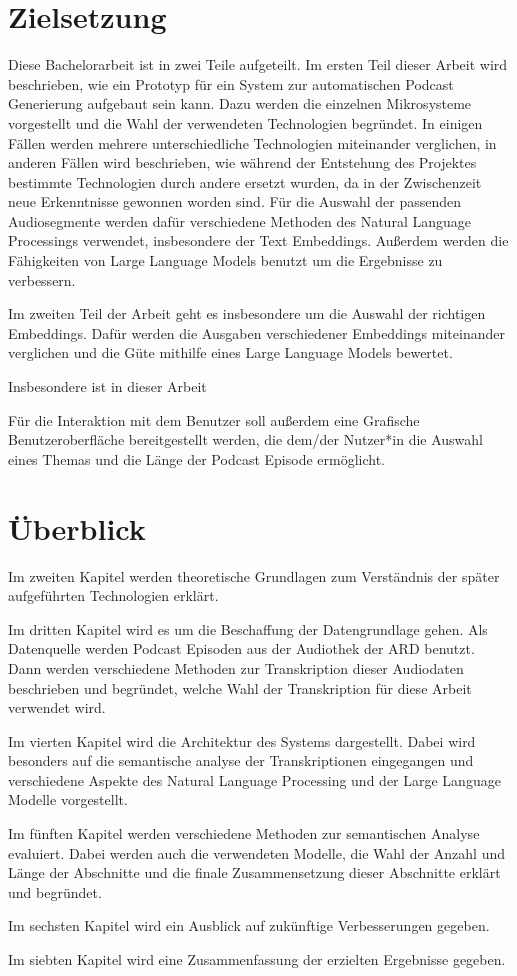 \section{Zielsetzung}




Diese Bachelorarbeit ist in zwei Teile aufgeteilt.
Im ersten Teil dieser Arbeit wird beschrieben, wie ein Prototyp für ein System zur automatischen Podcast Generierung aufgebaut sein kann.
Dazu werden die einzelnen Mikrosysteme vorgestellt und die Wahl der verwendeten Technologien begründet.
In einigen Fällen werden mehrere unterschiedliche Technologien miteinander verglichen, in anderen Fällen wird beschrieben, wie während der Entstehung des Projektes bestimmte Technologien durch andere ersetzt wurden, da in der Zwischenzeit neue Erkenntnisse gewonnen worden sind.
Für die Auswahl der passenden Audiosegmente werden dafür verschiedene Methoden des Natural Language Processings verwendet, insbesondere der Text Embeddings.
Außerdem werden die Fähigkeiten von Large Language Models benutzt um die Ergebnisse zu verbessern.

Im zweiten Teil der Arbeit geht es insbesondere um die Auswahl der richtigen Embeddings.
Dafür werden die Ausgaben verschiedener Embeddings miteinander verglichen und die Güte mithilfe eines Large Language Models bewertet.



Insbesondere ist in dieser Arbeit 

Für die Interaktion mit dem Benutzer soll außerdem eine Grafische Benutzeroberfläche bereitgestellt werden, die dem/der Nutzer*in die Auswahl eines Themas und die Länge der Podcast Episode ermöglicht.

\section{Überblick}

Im zweiten Kapitel werden theoretische Grundlagen zum Verständnis der später aufgeführten Technologien erklärt.

Im dritten Kapitel wird es um die Beschaffung der Datengrundlage gehen. 
Als Datenquelle werden Podcast Episoden aus der Audiothek der ARD benutzt. 
Dann werden verschiedene Methoden zur Transkription dieser Audiodaten beschrieben und begründet, welche Wahl der Transkription für diese Arbeit verwendet wird.

Im vierten Kapitel wird die Architektur des Systems dargestellt. 
Dabei wird besonders auf die semantische analyse der Transkriptionen eingegangen und verschiedene Aspekte des Natural Language Processing und der Large Language Modelle vorgestellt.

Im fünften Kapitel werden verschiedene Methoden zur semantischen Analyse evaluiert.
Dabei werden auch die verwendeten Modelle, die Wahl der Anzahl und Länge der Abschnitte und die finale Zusammensetzung dieser Abschnitte erklärt und begründet.

Im sechsten Kapitel wird ein Ausblick auf zukünftige Verbesserungen gegeben.

Im siebten Kapitel wird eine Zusammenfassung der erzielten Ergebnisse gegeben.
